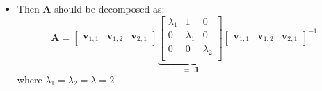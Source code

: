 \documentclass[12pt,a4paper]{article}
\begin{document}
\begin{itemize}
\begin{itemize}
\item Then $\bm{A}$ should be decomposed as:
  \begin{equation}\nonumber%
    \bm{A}
    =
      \begin{bmatrix}
        \bm{v}_{1,1} & \bm{v}_{1,2} & \bm{v}_{2,1}
      \end{bmatrix}
      \underbrace{
      \begin{bmatrix}
        \lambda_{1} & 1 & 0 \\
        0 & \lambda_{1} & 0 \\
        0 & 0 & \lambda_{2} \\
      \end{bmatrix}}_{=:\bm{J}}
      \begin{bmatrix}
        \bm{v}_{1,1} & \bm{v}_{1,2} & \bm{v}_{2,1}
      \end{bmatrix}^{-1}
    \end{equation}
    where $\lambda_{1}=\lambda_{2}=\lambda = 2$


\end{itemize}
\end{itemize}
\end{document}
